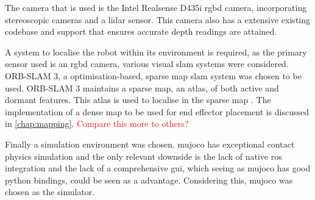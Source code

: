     The camera that is used is the Intel Realsense D435i \ac{rgbd} camera, incorporating stereoscopic cameras and a \ac{lidar} sensor.
    This camera also has a extensive existing codebase and support that ensures accurate depth readings are attained.

    A system to localise the robot within its environment is required, as the primary sensor used is an \ac{rgbd} camera, various visual
    \ac{slam} systems were considered. ORB-SLAM 3, a optimisation-based, sparse map \ac{slam} system was chosen to be used. ORB-SLAM 3 maintains
    a sparse map, an atlas, of both active and dormant features. This atlas is used to localise in the sparse map \citep{macario2022comprehensive}.
    The implementation of a dense map to be used for end effector placement is discussed in \autoref{chap:mapping}.
    \textcolor{red}{Compare this more to others?}

    Finally a simulation environment was chosen. \ac{mujoco} has exceptional contact physics simulation and the only relevant
    downside is the lack of native \ac{ros} integration and the lack of a comprehensive \ac{gui}, which seeing as \ac{mujoco} has good python bindings,
    could be seen as a advantage. Considering this, \ac{mujoco} was chosen as the simulator.